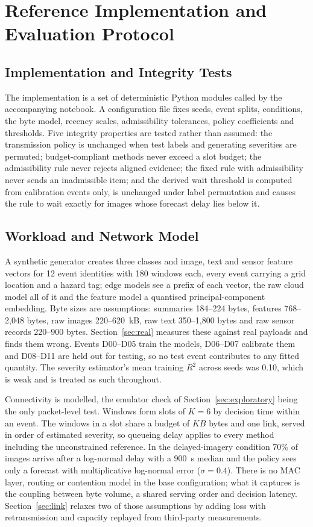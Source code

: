 \documentclass[conference,a4paper]{IEEEtran}
\begin{document}
\section{Reference Implementation and Evaluation Protocol}
\subsection{Implementation and Integrity Tests}
The implementation is a set of deterministic Python modules called by the accompanying notebook. A configuration file fixes seeds, event splits, conditions, the byte model, recency scales, admissibility tolerances, policy coefficients and thresholds. Five integrity properties are tested rather than assumed: the transmission policy is unchanged when test labels and generating severities are permuted; budget-compliant methods never exceed a slot budget; the admissibility rule never rejects aligned evidence; the fixed rule with admissibility never sends an inadmissible item; and the derived wait threshold is computed from calibration events only, is unchanged under label permutation and causes the rule to wait exactly for images whose forecast delay lies below it.

\subsection{Workload and Network Model}
\label{sec:workload}
A synthetic generator creates three classes and image, text and sensor feature vectors for 12 event identities with 180 windows each, every event carrying a grid location and a hazard tag; edge models see a prefix of each vector, the raw cloud model all of it and the feature model a quantised principal-component embedding. Byte sizes are assumptions: summaries 184--224 bytes, features 768--2,048 bytes, raw images 220--620~kB, raw text 350--1,800 bytes and raw sensor records 220--900 bytes. Section~\ref{sec:real} measures these against real payloads and finds them wrong. Events D00--D05 train the models, D06--D07 calibrate them and D08--D11 are held out for testing, so no test event contributes to any fitted quantity. The severity estimator's mean training $R^2$ across seeds was 0.10, which is weak and is treated as such throughout.

Connectivity is modelled, the emulator check of Section~\ref{sec:exploratory} being the only packet-level test. Windows form slots of $K=6$ by decision time within an event. The windows in a slot share a budget of $KB$ bytes and one link, served in order of estimated severity, so queueing delay applies to every method including the unconstrained reference. In the delayed-imagery condition 70\% of images arrive after a log-normal delay with a 900~s median and the policy sees only a forecast with multiplicative log-normal error ($\sigma=0.4$). There is no MAC layer, routing or contention model in the base configuration; what it captures is the coupling between byte volume, a shared serving order and decision latency. Section~\ref{sec:link} relaxes two of those assumptions by adding loss with retransmission and capacity replayed from third-party measurements.
\end{document}
